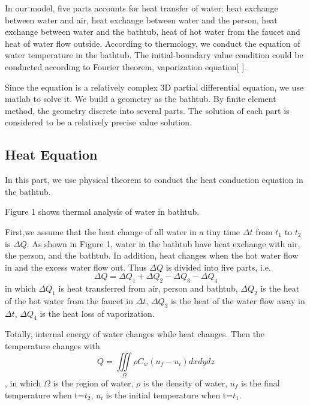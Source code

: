 \documentclass[12pt,a4paper,titlepage]{article}
\begin{document}
In our model, five parts accounts for heat transfer of water: heat exchange between water and air, heat
exchange between water and the person, heat exchange between water and the bathtub, heat of hot water from the
faucet and heat of water flow outside. According to thermology, we conduct the equation
of water temperature in the bathtub. The initial-boundary value condition could be conducted according to
Fourier theorem, vaporization equation[ ].

Since the equation is a relatively complex 3D partial differential equation, we use matlab to solve it.
We build a geometry as the bathtub. By finite element method, the geometry discrete into several parts.
The solution of each part is considered to be a relatively precise value solution.



\subsection{Heat Equation}
\label{sec:heat equation}

In this part, we use physical theorem to conduct the heat conduction equation
in the bathtub.

Figure 1 shows thermal analysis of water in bathtub.

First,we assume that the heat change of all water in a tiny time $\Delta t$ from $t_1$ to $t_2$ is $\Delta Q$.
As shown in Figure 1, water in the bathtub have heat exchange with air, the person, and the bathtub.
In addition, heat changes when the hot water flow in and the excess water flow out.
Thus $\Delta Q$ is divided into five parts, i.e.
\begin{equation}
 \Delta Q=\Delta Q_1+\Delta Q_2-\Delta Q_3-\Delta Q_4
\end{equation}
in which $\Delta Q_1$ is heat transferred from air, person and bathtub,
$\Delta Q_2$ is the heat of the hot water from the faucet in $\Delta t$,
$\Delta Q_3$ is the heat of the water flow away in $\Delta t$,
$\Delta Q_4$ is the heat loss of vaporization.

Totally, internal energy of water changes while heat changes.
Then the temperature changes with
\begin{equation}
 Q=\iiint\limits_{\Omega}\rho C_{w}(u_f - u_i)dx dy dz
\end{equation}
, in which $\Omega$ is the region of water, $\rho$ is the density of water, $u_f$ is the final temperature when t=$t_2$, $u_i$ is the initial temperature when t=$t_1$.
\end{document}
